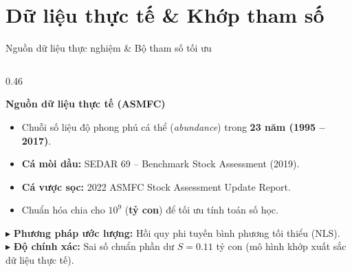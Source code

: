 \documentclass[aspectratio=169, 10pt]{beamer}
\begin{document}
\section{Dữ liệu thực tế \& Khớp tham số}

\begin{frame}{Nguồn dữ liệu thực nghiệm \& Bộ tham số tối ưu}
  \begin{columns}[c]
    \begin{column}{0.46\textwidth}
      \begin{block}{\textbf{Nguồn dữ liệu thực tế (ASMFC)}}
        \footnotesize
        \begin{itemize}
          \setlength{\itemsep}{3pt}
          \item Chuỗi số liệu độ phong phú cá thể (\textit{abundance}) trong \textbf{23 năm (1995 -- 2017)}.
          \item \textbf{Cá mòi dầu:} SEDAR 69 -- Benchmark Stock Assessment (2019).
          \item \textbf{Cá vược sọc:} 2022 ASMFC Stock Assessment Update Report.
          \item Chuẩn hóa chia cho $10^9$ (\textbf{tỷ con}) để tối ưu tính toán số học.
        \end{itemize}
      \end{block}

      \vspace{0.15cm}

      \begin{tcolorbox}[colback=OceanLight, colframe=OceanNavy, arc=1.5mm, top=1.2mm, bottom=1.2mm]
        \scriptsize
        $\blacktriangleright$ \textbf{Phương pháp ước lượng:} Hồi quy phi tuyến bình phương tối thiểu (NLS).\\
        $\blacktriangleright$ \textbf{Độ chính xác:} Sai số chuẩn phần dư $S = \mathbf{0.11}$ tỷ con (mô hình khớp xuất sắc dữ liệu thực tế).
      \end{tcolorbox}
    \end{column}


\end{columns}
\end{frame}
\end{document}

